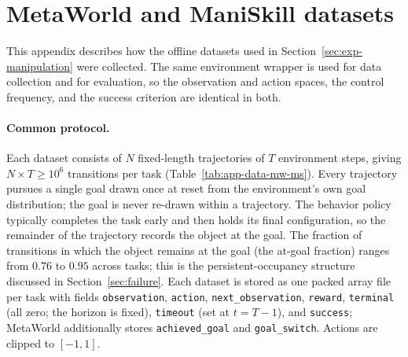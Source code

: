 \section{MetaWorld and ManiSkill datasets}
\label{app:data-mw-ms}

This appendix describes how the offline datasets used in Section~\ref{sec:exp-manipulation} were collected.
The same environment wrapper is used for data collection and for evaluation, so the observation and action spaces, the control frequency, and the success criterion are identical in both.

\paragraph{Common protocol.}
Each dataset consists of $N$ fixed-length trajectories of $T$ environment steps, giving $N \times T \geq 10^6$ transitions per task (Table~\ref{tab:app-data-mw-ms}).
Every trajectory pursues a single goal drawn once at reset from the environment's own goal distribution; the goal is never re-drawn within a trajectory.
The behavior policy typically completes the task early and then holds its final configuration, so the remainder of the trajectory records the object at the goal.
The fraction of transitions in which the object remains at the goal (the at-goal fraction) ranges from $0.76$ to $0.95$ across tasks; this is the persistent-occupancy structure discussed in Section~\ref{sec:failure}.
Each dataset is stored as one packed array file per task with fields \texttt{observation}, \texttt{action}, \texttt{next\_observation}, \texttt{reward}, \texttt{terminal} (all zero; the horizon is fixed), \texttt{timeout} (set at $t = T-1$), and \texttt{success}; MetaWorld additionally stores \texttt{achieved\_goal} and \texttt{goal\_switch}.
Actions are clipped to $[-1,1]$.

